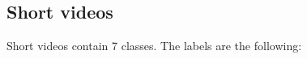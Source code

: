         \subsection{Short videos}
        Short videos contain 7 classes. The labels are the following:

